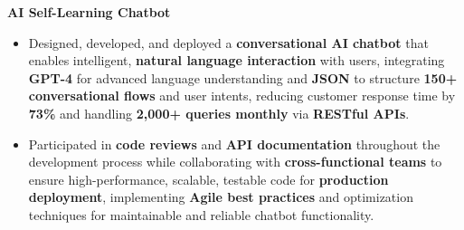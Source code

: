 \documentclass[a4paper,10pt]{article}
\begin{document}
\vspace{-2mm}
\textbf{AI Self-Learning Chatbot} \\
\begin{itemize}[leftmargin=*, itemsep=0pt, parsep=1pt]
\vspace{-7mm}
    \item Designed, developed, and deployed a \textbf{conversational AI chatbot} that enables intelligent, \textbf{natural language interaction} with users, integrating \textbf{GPT-4} for advanced language understanding and \textbf{JSON} to structure \textbf{150+ conversational flows} and user intents, reducing customer response time by \textbf{73\%} and handling \textbf{2,000+ queries monthly} via \textbf{RESTful APIs}.
    \item Participated in \textbf{code reviews} and \textbf{API documentation} throughout the development process while collaborating with \textbf{cross-functional teams} to ensure high-performance, scalable, testable code for \textbf{production deployment}, implementing \textbf{Agile best practices} and optimization techniques for maintainable and reliable chatbot functionality.
\end{itemize}

\vspace{-2mm}
\end{document}
